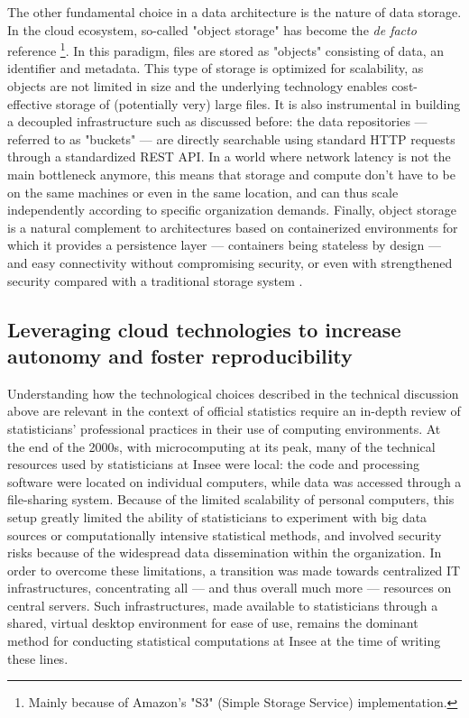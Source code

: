 \documentclass[graybox]{svmult}
\begin{document}
The other fundamental choice in a data architecture is the nature of data storage. In the cloud ecosystem, so-called "object storage" has become the {\it de facto} reference \cite{samundiswary2017object}\footnote{Mainly because of Amazon's "S3" (Simple Storage Service) implementation.}. In this paradigm, files are stored as "objects" consisting of data, an identifier and metadata. This type of storage is optimized for scalability, as objects are not limited in size and the underlying technology enables cost-effective storage of (potentially very) large files. It is also instrumental in building a decoupled infrastructure such as discussed before: the data repositories — referred to as "buckets" — are directly searchable using standard HTTP requests through a standardized REST API. In a world where network latency is not the main bottleneck anymore, this means that storage and compute don't have to be on the same machines or even in the same location, and can thus scale independently according to specific organization demands. Finally, object storage is a natural complement to architectures based on containerized environments for which it provides a persistence layer — containers being stateless by design — and easy connectivity without compromising security, or even with strengthened security compared with a traditional storage system \cite{mesnier2003object}.

\subsection{Leveraging cloud technologies to increase autonomy and foster reproducibility}

Understanding how the technological choices described in the technical discussion above are relevant in the context of official statistics require an in-depth review of statisticians’ professional practices in their use of computing environments. At the end of the 2000s, with microcomputing at its peak, many of the technical resources used by statisticians at Insee were local: the code and processing software were located on individual computers, while data was accessed through a file-sharing system. Because of the limited scalability of personal computers, this setup greatly limited the ability of statisticians to experiment with big data sources or computationally intensive statistical methods, and involved security risks because of the widespread data dissemination within the organization. In order to overcome these limitations, a transition was made towards centralized IT infrastructures, concentrating all — and thus overall much more — resources on central servers. Such infrastructures, made available to statisticians through a shared, virtual desktop environment for ease of use, remains the dominant method for conducting statistical computations at Insee at the time of writing these lines.
\end{document}
